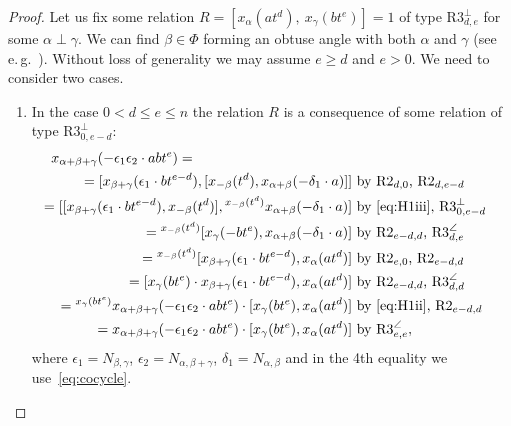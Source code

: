 \documentclass[oneside, 8pt]{amsart}
\theoremstyle{remark}
\theoremstyle{definition}
\numberwithin{lemma}{section}
\numberwithin{prop}{section}
\numberwithin{corollary}{section}
\numberwithin{externaltheorem}{section}
\numberwithin{equation}{section}
\begin{document}
\begin{proof}
Let us fix some relation $R = [x_\alpha(at^d),\ x_\gamma(bt^e)] = 1$ of type $\text{R3}^\bot_{d,e}$ for some $\alpha\perp\gamma$. We can find $\beta \in \Phi$ forming an obtuse angle with both $\alpha$ and $\gamma$ (see e.\,g.~\cite[Lemma~3.1.2]{RS76}).
Without loss of generality we may assume $e \geq d$ and $e > 0$. We need to consider two cases.
\begin{enumerate}
\item In the case $0 < d \leq e \leq n$ the relation $R$ is a consequence of some relation of type $\text{R3}^\bot_{0,e-d}$:
\begin{align} x_{\alpha+\beta+\gamma}(-\epsilon_1 \epsilon_2 \cdot abt^e) = \hspace{4cm} \label{first-computation} \\ =
[x_{\beta+\gamma}(\epsilon_1 \cdot bt^{e-d}), [x_{-\beta}(t^d), x_{\alpha+\beta}(-\delta_1 \cdot a)] ] & \text{ by $\text{R2}_{d,0}$, $\text{R2}_{d, e-d}$} \nonumber \\ 
 = [[x_{\beta+\gamma}(\epsilon_1 \cdot bt^{e-d}), x_{-\beta}(t^d)], {}^{x_{-\beta}(t^d)} x_{\alpha+\beta}(- \delta_1 \cdot a)] & \text{ by~\eqref{eq:H1iii}, $\text{R3}^\bot_{0,e-d}$} \nonumber \\ 
 = {}^{x_{-\beta}(t^d)} [x_{\gamma}(- bt^e), x_{\alpha+\beta}(-\delta_1 \cdot a)] & \text{ by $\text{R2}_{e-d,d}$, $\text{R3}^\angle_{d,e}$} \nonumber \\ 
 = {}^{x_{-\beta}(t^d)} [x_{\beta + \gamma}(\epsilon_1 \cdot bt^{e-d}), x_{\alpha}(at^d)] & \text{ by $\text{R2}_{e,0}$, $\text{R2}_{e-d,d}$} \nonumber \\ 
 = [x_{\gamma}(bt^e) \cdot x_{\beta + \gamma}(\epsilon_1 \cdot bt^{e-d}), x_{\alpha}(at^d)] & \text{ by $\text{R2}_{e-d,d}$, $\text{R3}^\angle_{d,d}$} \nonumber \\ 
 = {}^{x_\gamma(bt^e)}x_{\alpha+\beta+\gamma}(-\epsilon_1\epsilon_2 \cdot abt^e) \cdot [x_\gamma(bt^e), x_\alpha(at^d)] & \text{ by~\eqref{eq:H1ii}, $\text{R2}_{e-d,d}$} \nonumber \\
 = x_{\alpha+\beta+\gamma}(-\epsilon_1\epsilon_2 \cdot abt^e) \cdot [x_\gamma(bt^e), x_\alpha(at^d)] & \text{ by $\text{R3}^\angle_{e,e}$}, \nonumber \end{align}
 where $\epsilon_1 = N_{\beta,\gamma}$, $\epsilon_2 = N_{\alpha,\beta+\gamma}$, $\delta_1 = N_{\alpha,\beta}$ and in the 4th equality we use~\eqref{eq:cocycle}.
  

\end{enumerate}
\end{proof}
\end{document}
